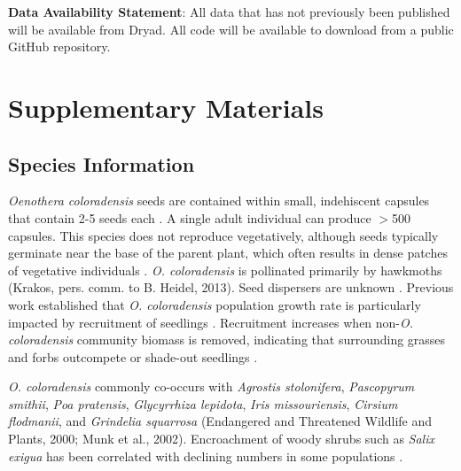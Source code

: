 \documentclass[12pt, letterpaper]{article}
\renewcommand{\thesection}{} %
\begin{document}
\small{\textbf{Data Availability Statement}: All data that has not previously been published will be available from Dryad. All code will be available to download from a public GitHub repository.}



\newpage

\setcounter{figure}{0}
\setcounter{table}{0}
\setcounter{section}{0}
\setcounter{page}{1}

\renewcommand{\thepage}{S\arabic{page}}
\renewcommand{\thesection}{S\arabic{section}}
\renewcommand{\thetable}{S\arabic{table}}
\renewcommand{\thefigure}{S\arabic{figure}}

\section{Supplementary Materials}
\normalfont
\subsection{Species Information}
\textit{Oenothera coloradensis} seeds are contained within small, indehiscent capsules that contain 2-5 seeds each \cite{Burgess2005CapsuleColoradensis}. A single adult individual can produce $>$500 capsules. This species does not reproduce vegetatively, although seeds typically germinate near the base of the parent plant, which often results in dense patches of vegetative individuals \cite{Heidel202133-YearWyoming}. \textit{O. coloradensis} is pollinated primarily by hawkmoths (Krakos, pers. comm. to B. Heidel, 2013). Seed dispersers are unknown \cite{Floyd1998, Heidel202133-YearWyoming}. Previous work established that \textit{O. coloradensis} population growth rate is particularly impacted by recruitment of seedlings \cite{Floyd1998}. Recruitment increases when non-\textit{O. coloradensis} community biomass is removed, indicating that surrounding grasses and forbs outcompete or shade-out seedlings \cite{Munk2002RosetteSpecies}.
\nocite{krakosPersonalComm}

\textit{O. coloradensis} commonly co-occurs with \textit{Agrostis stolonifera}, \textit{Pascopyrum smithii}, \textit{Poa pratensis}, \textit{Glycyrrhiza lepidota}, \textit{Iris missouriensis}, \textit{Cirsium flodmanii}, and \textit{Grindelia squarrosa} (Endangered and Threatened Wildlife and Plants, 2000; Munk et al., 2002). Encroachment of woody shrubs such as \textit{Salix exigua} has been correlated with declining numbers in some populations \cite{Heidel202133-YearWyoming}.
\end{document}
